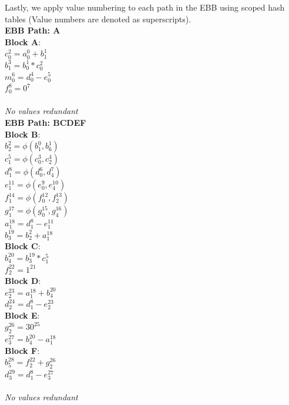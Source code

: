 \documentclass[11pt]{article}
\begin{document}
\begin{enumerate}
\begin{Answer}
		Lastly, we apply value numbering to each path in the EBB using scoped hash tables (Value numbers are denoted as superscripts). \\
		\textbf{EBB Path: A} \\
		\textbf{Block A}: \\
		$c_0^2 = a_0^0 + b_1^1$ \\
		$b_1^3 = b_0^1 * c_0^2$ \\
		$m_0^6 = d_0^4 - e_0^5$ \\
		$f_0^8 = 0^7$ \\
		\\
		\textit{No values redundant} \\
		
		\textbf{EBB Path: BCDEF} \\
		\textbf{Block B}: \\
		$b_2^2 = \phi(b_1^0, b_6^1)$ \\
		$c_1^5 = \phi(c_0^3, c_2^4)$ \\
		$d_1^8 = \phi(d_0^6, d_4^7)$ \\
		$e_1^{11} = \phi(e_0^9, e_4^{10})$ \\
		$f_1^{14} = \phi(f_0^{12}, f_2^{13})$ \\
		$g_1^{17} = \phi(g_0^{15}, g_4^{16})$ \\
		$a_1^{18} = d_1^8 - e_1^{11}$ \\
		$b_3^{19} = b_2^2 + a_1^{18}$ \\
		\textbf{Block C}: \\
		$b_4^{20} = b_3^{19} * c_1^5$ \\
		$f_2^{22} = 1^{21}$ \\
		\textbf{Block D}: \\
		$e_2^{23} = a_1^{18} + b_4^{20}$ \\
		$d_2^{24} = d_1^{8} - e_2^{23}$ \\
		\textbf{Block E}: \\
		$g_2^{26} = 30^{25}$ \\
		$e_3^{27} = b_4^{20} - a_1^{18}$ \\
		\textbf{Block F}: \\
		$b_5^{28} = f_2^{22} + g_2^{26}$ \\
		$d_3^{29} = d_1^{8} - e_3^{27}$ \\
		\\
		\textit{No values redundant} \\


\end{Answer}
\end{enumerate}
\end{document}
